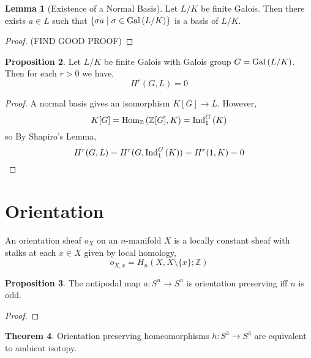 \documentclass[12pt]{extarticle}
\newcommand{\Hom}[3]{\mathrm{Hom}_{#1}\left( #2, #3 \right)}
\newcommand{\Z}{\mathbb{Z}}
\theoremstyle{definition}
\newtheorem{theorem}{Theorem}[section]
\newtheorem{lemma}[theorem]{Lemma}
\newtheorem{proposition}[theorem]{Proposition}
\newenvironment{definition}[1][Definition:]{\begin{trivlist}
\item[\hskip \labelsep {\bfseries #1}]}{\end{trivlist}}
\begin{document}
\begin{lemma}[Existence of a Normal Basis]
Let $L/K$ be finite Galois. Then there exists $a \in L$ such that $\{ \sigma a \mid \sigma \in \mathrm{Gal}\left( L/K \right) \}$ is a basis of $L / K$. 
\end{lemma}

\begin{proof}
(FIND GOOD PROOF)
\end{proof}

\begin{proposition}
Let $L / K$ be finite Galois with Galois group $G = \mathrm{Gal}\left( L/K \right)$. Then for each $r > 0$ we have,
\[ H^r(G, L) = 0 \]
\end{proposition}

\begin{proof}
A normal basis gives an isomorphism $K[G] \to L$. However, 
\[ K[G] = \Hom{\Z}{\Z[G]}{K} = \Ind{G}{1}{K} \]
so By Shapiro's Lemma,
\[ H^r(G, L) = H^r(G, \mathrm{Ind}^{G}_{1} \left(K\right)) = H^r(1, K) = 0 \]
\end{proof}

\section{Orientation}

\begin{definition}
An orientation sheaf $o_X$ on an $n$-manifold $X$ is a locally constant sheaf with stalks at each $x \in X$ given by local homology,
\[ o_{X,x} = H_n(X, X \setminus \{ x \} ; \Z) \]
\end{definition}

\begin{proposition}
The antipodal map $a : S^n \to S^n$ is orientation preserving iff $n$ is odd.
\end{proposition}

\begin{proof}

\end{proof}

\begin{theorem}
Orientation preserving homeomorphisms $h : S^3 \to S^3$ are equivalent to ambient isotopy. 
\end{theorem}
\end{document}
